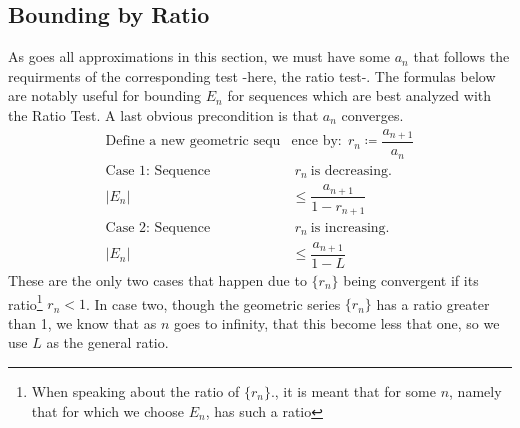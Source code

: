 \documentclass[11pt]{article}
\newcommand{\define}{\coloneqq}
\newcommand{\abs}[1]{\left| #1 \right|}
\begin{document}
	\subsection*{Bounding by Ratio}
		As goes all approximations in this section, we must have some $a_n$ that follows the requirments of the corresponding test -here, the 
		ratio test-. The formulas below are notably useful for bounding $E_n$ for sequences which are best analyzed with the Ratio Test. A last
		obvious precondition is that $a_n$ converges.
			\begin{align}
				\text{Define a new geometric sequ} &\text{ence by:} \ \ r_n \define \dfrac{a_{n+1}}{a_n} \\
					\text{Case $1$: Sequence}& \ {r_n} \ \text{is decreasing.} \\
						\abs{E_n}& \leq \dfrac{a_{n + 1}}{1 - r_{n + 1}} \\
					\text{Case $2$: Sequence}& \ {r_n} \ \text{is increasing.} \\
						\abs{E_n}& \leq \dfrac{a_{n + 1}}{1 - L}
			\end{align}
		These are the only two cases that happen due to $\{r_n\}$ being convergent if its ratio\footnote{\label{ratioNote}When speaking about the ratio 
		of $\{r_n\}.$, it is meant that for some $n$, namely that for which we choose $E_n$, has such a ratio} $r_n < 1$. In case two, 
		though the geometric series $\{r_n\}$ has a ratio greater than 1, we know that as $n$ goes to infinity, that this become less that one, so we
		use $L$ as the general ratio.
\end{document}
